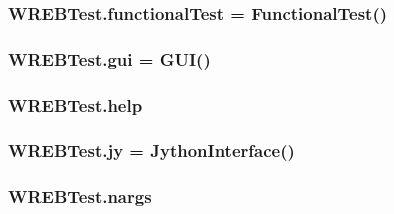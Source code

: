 \subsubsection[{\texorpdfstring{functional\+Test}{functionalTest}}]{\setlength{\rightskip}{0pt plus 5cm}W\+R\+E\+B\+Test.\+functional\+Test = {\bf Functional\+Test}()}\hypertarget{namespace_w_r_e_b_test_a6b29a5575cde4179f69fd406d86e7376}{}\label{namespace_w_r_e_b_test_a6b29a5575cde4179f69fd406d86e7376}
\subsubsection[{\texorpdfstring{gui}{gui}}]{\setlength{\rightskip}{0pt plus 5cm}W\+R\+E\+B\+Test.\+gui = {\bf G\+UI}()}\hypertarget{namespace_w_r_e_b_test_aa381e7d29068259ccd5af4c247ed6ef4}{}\label{namespace_w_r_e_b_test_aa381e7d29068259ccd5af4c247ed6ef4}
\subsubsection[{\texorpdfstring{help}{help}}]{\setlength{\rightskip}{0pt plus 5cm}W\+R\+E\+B\+Test.\+help}\hypertarget{namespace_w_r_e_b_test_adfd76e5c2885c24fa27e9fcec701bba2}{}\label{namespace_w_r_e_b_test_adfd76e5c2885c24fa27e9fcec701bba2}
\subsubsection[{\texorpdfstring{jy}{jy}}]{\setlength{\rightskip}{0pt plus 5cm}W\+R\+E\+B\+Test.\+jy = {\bf Jython\+Interface}()}\hypertarget{namespace_w_r_e_b_test_addc827d4eb188c8ba6f94df2c7b6b8fa}{}\label{namespace_w_r_e_b_test_addc827d4eb188c8ba6f94df2c7b6b8fa}
\subsubsection[{\texorpdfstring{nargs}{nargs}}]{\setlength{\rightskip}{0pt plus 5cm}W\+R\+E\+B\+Test.\+nargs}\hypertarget{namespace_w_r_e_b_test_a49236807c2137fa4461bb379abfd33fc}{}\label{namespace_w_r_e_b_test_a49236807c2137fa4461bb379abfd33fc}
